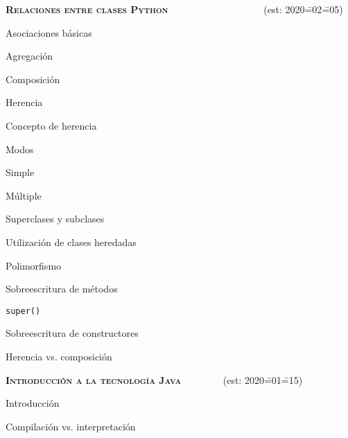 \begin{longenum}
\begin{longenum}
\begin{longenum}
        \end{longenum}
    \end{longenum}
    \item \textbf{\textsc{Relaciones entre clases Python}} \ \ \ \ \ \ \ \ \ \ \ \ \ \ \ \ \ \ \ (est: 2020\==02\==05)
    \begin{longenum}
        \item Asociaciones básicas
        \begin{longenum}
            \item Agregación
            \item Composición
        \end{longenum}
        \item Herencia
        \begin{longenum}
            \item Concepto de herencia
            \item Modos
            \begin{longenum}
                \item Simple
                \item Múltiple
            \end{longenum}
            \item Superclases y subclases
            \item Utilización de clases heredadas
        \end{longenum}
        \item Polimorfismo
        \begin{longenum}
            \item Sobreescritura de métodos
            \item \texttt{super()}
            \item Sobreescritura de constructores
        \end{longenum}
        \item Herencia vs. composición
    \end{longenum}
    \item \textbf{\textsc{Introducción a la tecnología Java}} \ \ \ \ \ \ \ \ (est: 2020\==01\==15)
    \begin{longenum}
        \item Introducción
        \item Compilación vs. interpretación
        \begin{longenum}

\end{longenum}
\end{longenum}
\end{longenum}
